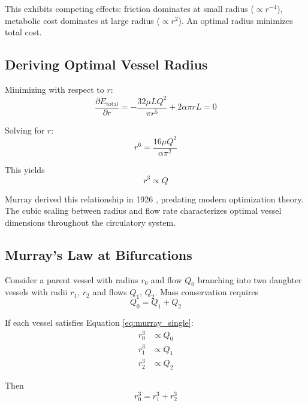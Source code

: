 This exhibits competing effects: friction dominates at small radius ($\propto r^{-4}$), metabolic cost dominates at large radius ($\propto r^{2}$). An optimal radius minimizes total cost.

\subsection{Deriving Optimal Vessel Radius}

Minimizing with respect to $r$:
\begin{equation}
\frac{\partial \dot{E}_{\mathrm{total}}}{\partial r} = -\frac{32\mu L Q^{2}}{\pi r^{5}} + 2\alpha \pi r L = 0
\end{equation}

Solving for $r$:
\begin{equation}
r^{6} = \frac{16\mu Q^{2}}{\alpha \pi^{2}}
\end{equation}

This yields
\begin{equation}
r^{3} \propto Q
\label{eq:murray_single}
\end{equation}

Murray derived this relationship in 1926 \cite{murray1926physiological}, predating modern optimization theory. The cubic scaling between radius and flow rate characterizes optimal vessel dimensions throughout the circulatory system.

\subsection{Murray's Law at Bifurcations}

Consider a parent vessel with radius $r_{0}$ and flow $Q_{0}$ branching into two daughter vessels with radii $r_{1}$, $r_{2}$ and flows $Q_{1}$, $Q_{2}$. Mass conservation requires
\begin{equation}
Q_{0} = Q_{1} + Q_{2}
\end{equation}

If each vessel satisfies Equation \ref{eq:murray_single}:
\begin{align}
r_{0}^{3} &\propto Q_{0} \\
r_{1}^{3} &\propto Q_{1} \\
r_{2}^{3} &\propto Q_{2}
\end{align}

Then
\begin{equation}
r_{0}^{3} = r_{1}^{3} + r_{2}^{3}
\label{eq:murray_bifurcation}
\end{equation}

